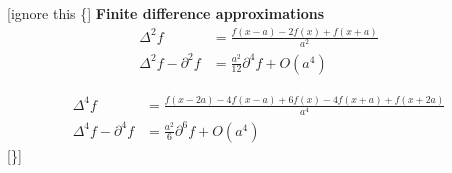 \documentclass[aps,prb,twocolumn,letterpaper,twoside,nobalancelastpage,groupedaddress,amsmath,amssymb,floatfix,citeautoscript]{revtex4-1}
\begin{document}

[ignore this \{]
\textbf{Finite difference approximations}
\begin{align*}
\Delta^2 f &= \frac{f(x-a) - 2f(x) + f(x+a)}{a^2}\\
\Delta^2 f - \partial^2 f &= \frac{a^2}{12}\partial^4f + O(a^4)
\end{align*}

\begin{align*}
\Delta^4 f &= \frac{f(x-2a) - 4f(x-a) + 6f(x) - 4f(x+a) + f(x+2a)}{a^4}\\
\Delta^4 f - \partial^4 f &= \frac{a^2}{6}\partial^6 f + O(a^4)
\end{align*}
[\}]
\end{document}
